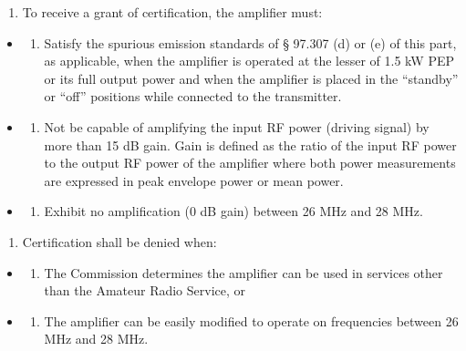 \documentclass[
  letterpaper,
  DIV=11,
  numbers=noendperiod]{scrreport}
\providecommand{\tightlist}{%
  \setlength{\itemsep}{0pt}\setlength{\parskip}{0pt}}\usepackage{longtable,booktabs,array}
\begin{document}
\begin{enumerate}
\def\labelenumi{(\alph{enumi})}
\tightlist
\item
  To receive a grant of certification, the amplifier must:
\end{enumerate}

\begin{itemize}
\item
  \begin{enumerate}
  \def\labelenumi{(\arabic{enumi})}
  \tightlist
  \item
    Satisfy the spurious emission standards of § 97.307 (d) or (e) of
    this part, as applicable, when the amplifier is operated at the
    lesser of 1.5 kW PEP or its full output power and when the amplifier
    is placed in the ``standby'' or ``off'' positions while connected to
    the transmitter.
  \end{enumerate}
\item
  \begin{enumerate}
  \def\labelenumi{(\arabic{enumi})}
  \setcounter{enumi}{1}
  \tightlist
  \item
    Not be capable of amplifying the input RF power (driving signal) by
    more than 15 dB gain. Gain is defined as the ratio of the input RF
    power to the output RF power of the amplifier where both power
    measurements are expressed in peak envelope power or mean power.
  \end{enumerate}
\item
  \begin{enumerate}
  \def\labelenumi{(\arabic{enumi})}
  \setcounter{enumi}{2}
  \tightlist
  \item
    Exhibit no amplification (0 dB gain) between 26 MHz and 28 MHz.
  \end{enumerate}
\end{itemize}

\begin{enumerate}
\def\labelenumi{(\alph{enumi})}
\setcounter{enumi}{1}
\tightlist
\item
  Certification shall be denied when:
\end{enumerate}

\begin{itemize}
\item
  \begin{enumerate}
  \def\labelenumi{(\arabic{enumi})}
  \tightlist
  \item
    The Commission determines the amplifier can be used in services
    other than the Amateur Radio Service, or
  \end{enumerate}
\item
  \begin{enumerate}
  \def\labelenumi{(\arabic{enumi})}
  \setcounter{enumi}{1}
  \tightlist
  \item
    The amplifier can be easily modified to operate on frequencies
    between 26 MHz and 28 MHz.
  \end{enumerate}
\end{itemize}
\end{document}

